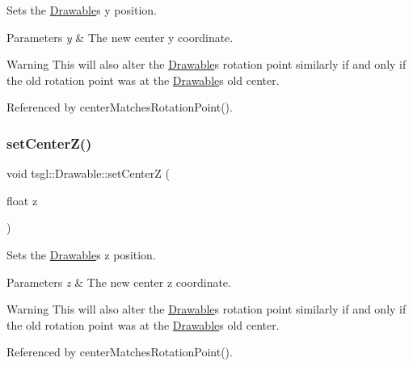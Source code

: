 Sets the \hyperlink{classtsgl_1_1_drawable}{Drawable}\textquotesingle{}s y position. 


\begin{DoxyParams}{Parameters}
{\em y} & The new center y coordinate. \\
\hline
\end{DoxyParams}
\begin{DoxyWarning}{Warning}
This will also alter the \hyperlink{classtsgl_1_1_drawable}{Drawable}\textquotesingle{}s rotation point similarly if and only if the old rotation point was at the \hyperlink{classtsgl_1_1_drawable}{Drawable}\textquotesingle{}s old center. 
\end{DoxyWarning}


Referenced by center\+Matches\+Rotation\+Point().

\mbox{\label{classtsgl_1_1_drawable_a4fe0cabf3863d81fd9889975a0580b9b}} 
\subsubsection{\texorpdfstring{set\+Center\+Z()}{setCenterZ()}}
{\footnotesize\ttfamily void tsgl\+::\+Drawable\+::set\+CenterZ (\begin{DoxyParamCaption}\item[{float}]{z }\end{DoxyParamCaption})\hspace{0.3cm}{\ttfamily [virtual]}}



Sets the \hyperlink{classtsgl_1_1_drawable}{Drawable}\textquotesingle{}s z position. 


\begin{DoxyParams}{Parameters}
{\em z} & The new center z coordinate. \\
\hline
\end{DoxyParams}
\begin{DoxyWarning}{Warning}
This will also alter the \hyperlink{classtsgl_1_1_drawable}{Drawable}\textquotesingle{}s rotation point similarly if and only if the old rotation point was at the \hyperlink{classtsgl_1_1_drawable}{Drawable}\textquotesingle{}s old center. 
\end{DoxyWarning}


Referenced by center\+Matches\+Rotation\+Point().

